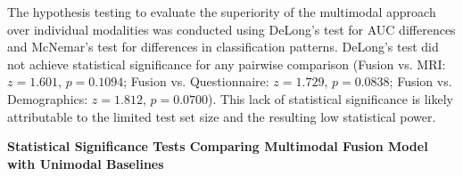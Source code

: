 \documentclass[10pt,letterpaper]{article}
\begin{document}
                                                                                                                          The hypothesis testing to evaluate the superiority of the multimodal approach over individual modalities was conducted using DeLong's test for AUC differences and McNemar's test for differences in classification patterns. DeLong's test did not achieve statistical significance for any pairwise comparison (Fusion vs. MRI: $z = 1.601$, $p = 0.1094$; Fusion vs. Questionnaire: $z = 1.729$, $p = 0.0838$; Fusion vs. Demographics: $z = 1.812$, $p = 0.0700$). This lack of statistical significance is likely attributable to the limited test set size and the resulting low statistical power.


                                                                                                                          \begin{table}[!t]
                                                                                                                          \begin{adjustwidth}{-2.25in}{0in}
                                                                                                                          \centering
                                                                                                                          \caption{\textbf{Statistical Significance Tests Comparing Multimodal Fusion Model with Unimodal Baselines}}
                                                                                                                          \label{tab:stat_tests}
                                                                                                                          \footnotesize
                                                                                                                          \renewcommand{\arraystretch}{1.3}
                                                                                                                          

\end{adjustwidth}
\end{table}
\end{document}
